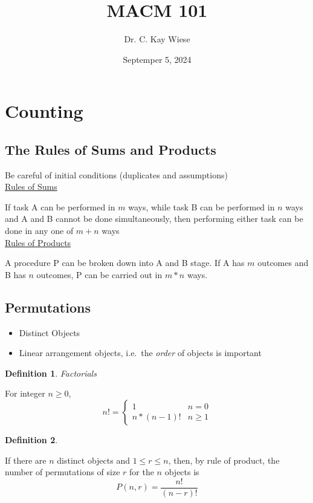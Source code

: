 \documentclass[12pt]{article}
\title{MACM 101}
\author{Dr. C. Kay Wiese}
\date{Septemper 5, 2024}
\newtheorem{definition}{Definition} [section]
\begin{document}
\maketitle

\section{Counting}

\subsection{The Rules of Sums and Products}

Be careful of initial conditions (duplicates and assumptions)
\\
\underline{Rules of Sums}

If task A can be performed in $m$ ways, while task B can be performed in $n$ ways and A and B cannot be done simultaneously, then performing either task can be done in any one of $m+n$ ways
\\
\underline{Rules of Products}

A procedure P can be broken down into A and B stage. If A has $m$ outcomes and B has $n$ outcomes, P can be carried out in $m * n$ ways.
\subsection{Permutations}
\begin{itemize}
\item Distinct Objects
\item Linear arrangement objects, i.e.\ the \emph{order} of objects is important
\end{itemize}
\begin{definition}Factorials\end{definition} For integer $n \geq 0$,
\[
n!=\begin{cases} 1 & n=0 \\ n*(n-1)!&n\geq1\end{cases}
\]
\begin{definition}\end{definition} \noindent If there are $n$ distinct objects and $ 1 \leq r \leq n $, then, by rule of product, the number of permutations of size $r$ for the $n$ objects is
\[
P(n, r) = \frac{n!}{(n-r)!}
\]
\end{document}
